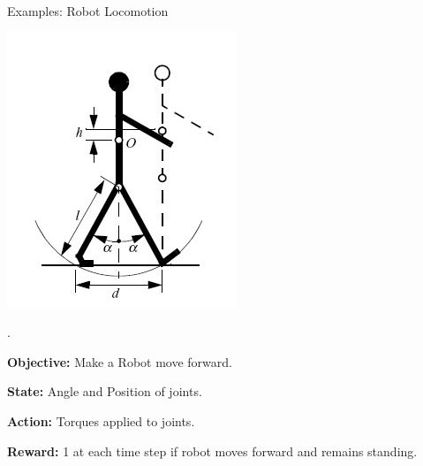 \documentclass{beamer}
\begin{document}
	\begin{frame}{Examples: Robot Locomotion}
		\begin{minipage}{3cm}
			\centering
			\includegraphics[width=\textwidth]{robotLocomotion.jpg}
		\end{minipage}%
		\begin{minipage}{1cm}
			.
		\end{minipage}%
		\begin{minipage}{7cm}
			\textbf{Objective:} Make a Robot move forward.
			
			\textbf{State:} Angle and Position of joints.
			
			\textbf{Action:} Torques applied to joints.
			
			\textbf{Reward:} 1 at each time step if robot moves forward and remains standing.
		\end{minipage}
	\end{frame}
	
\end{document}
